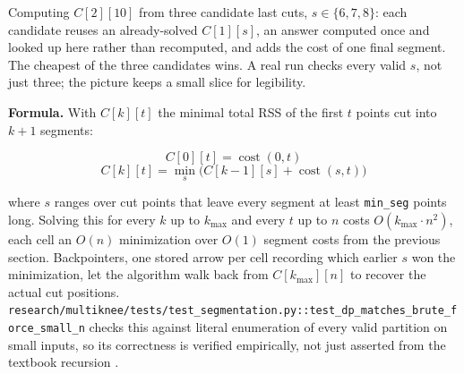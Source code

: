 \documentclass[11pt]{article}
\newcommand{\code}[1]{\texttt{#1}}
\begin{document}
\begin{center}
\end{center}
\begin{center}
\footnotesize
Computing $C[2][10]$ from three candidate last cuts, $s \in \{6,7,8\}$:
each candidate reuses an already-solved $C[1][s]$, an answer computed
once and looked up here rather than recomputed, and adds the cost of
one final segment. The cheapest of the three candidates wins. A real
run checks every valid $s$, not just three; the picture keeps a small
slice for legibility.
\end{center}

\textbf{Formula.} With $C[k][t]$ the minimal total RSS of the first $t$
points cut into $k+1$ segments:

\begin{equation}
C[0][t] = \operatorname{cost}(0, t)
\end{equation}
\begin{equation}
C[k][t] = \min_{s} \Big( C[k-1][s] + \operatorname{cost}(s, t) \Big)
\end{equation}

where $s$ ranges over cut points that leave every segment at least
\code{min\_seg} points long. Solving this for every $k$ up to $k_{\max}$ and
every $t$ up to $n$ costs $O(k_{\max} \cdot n^2)$, each cell an $O(n)$
minimization over $O(1)$ segment costs from the previous section.
Backpointers, one stored arrow per cell recording which earlier $s$ won
the minimization, let the algorithm walk back from $C[k_{\max}][n]$ to
recover the actual cut positions.
\code{research/multiknee/tests/test\_segmentation.py::\allowbreak test\_dp\_matches\_brute\_force\_small\_n}
checks this against literal enumeration of every valid partition on small
inputs, so its correctness is verified empirically, not just asserted from
the textbook recursion \citep{cormen2022algorithms,dasgupta2006algorithms}.
\end{document}
